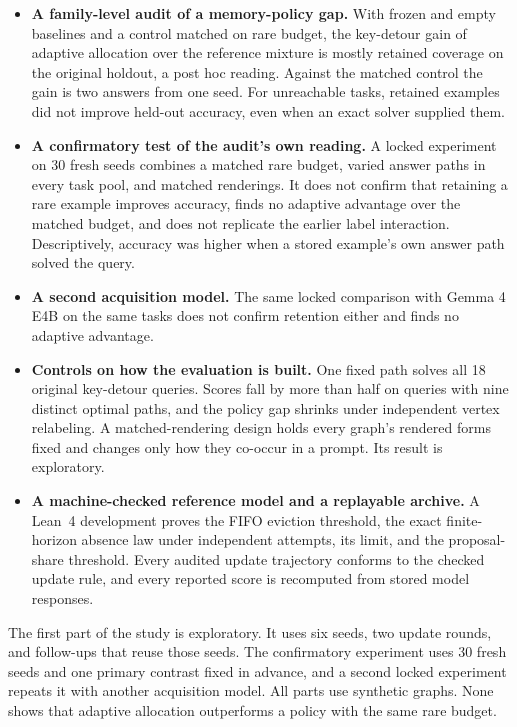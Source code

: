 \documentclass[11pt]{article}
\begin{document}
\begin{itemize}
\item \textbf{A family-level audit of a memory-policy gap.} With frozen
and empty baselines and a control matched on rare budget, the
key-detour gain of adaptive allocation over the reference mixture is
mostly retained coverage on the original holdout, a post hoc reading.
Against the matched control the gain is two
answers from one seed. For unreachable tasks, retained examples did
not improve held-out accuracy, even when an exact solver supplied them.
\item \textbf{A confirmatory test of the audit's own reading.} A locked
experiment on 30 fresh seeds combines a matched rare budget, varied
answer paths in every task pool, and matched renderings. It does not
confirm that retaining a rare example improves accuracy, finds no
adaptive advantage over the matched budget, and does not replicate the
earlier label interaction. Descriptively, accuracy was higher when a
stored example's own answer path solved the query.
\item \textbf{A second acquisition model.} The same locked comparison
with Gemma 4 E4B on the same tasks does not confirm retention either
and finds no adaptive advantage.
\item \textbf{Controls on how the evaluation is built.} One fixed path
solves all 18 original key-detour queries. Scores fall by more than
half on queries with nine distinct optimal paths, and the policy gap
shrinks under independent vertex relabeling. A matched-rendering design
holds every graph's rendered forms fixed and changes only how they
co-occur in a prompt. Its result is exploratory.
\item \textbf{A machine-checked reference model and a replayable
archive.} A Lean~4 development proves the FIFO eviction threshold, the
exact finite-horizon absence law under independent attempts, its limit,
and the proposal-share threshold. Every audited update trajectory
conforms to the checked update rule, and every reported score is
recomputed from stored model responses.
\end{itemize}

The first part of the study is exploratory. It uses six seeds, two
update rounds, and follow-ups that reuse those seeds. The confirmatory
experiment uses 30 fresh seeds and one primary contrast fixed in
advance, and a second locked experiment repeats it with another
acquisition model. All parts use synthetic graphs. None shows that
adaptive allocation outperforms a policy with the same rare budget.
\end{document}
